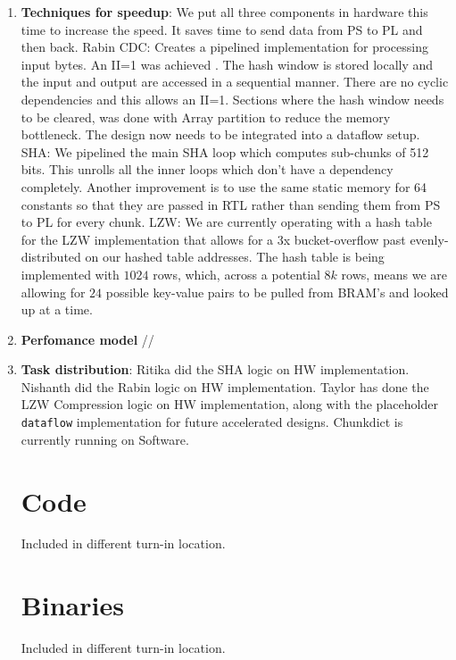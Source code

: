 \documentclass{article}
\begin{document}
\begin{enumerate}
\item%
\textbf{Techniques for speedup}: We put all three components in hardware this time to increase the speed. It saves time to send data from PS to PL and then back.  
Rabin CDC:
Creates a pipelined implementation for processing input bytes. An II=1 was achieved . The hash window is stored locally and the input and output are accessed in a sequential manner. 
There are no cyclic dependencies and this allows an II=1. 
Sections where the hash window needs to be cleared, was done with Array partition to reduce the memory bottleneck. 
The design now needs to be integrated into a dataflow setup. 
SHA:
We pipelined the main SHA loop which computes sub-chunks of 512 bits. This unrolls all the inner loops which don't have a dependency completely. 
 Another improvement is to use the same static memory for 64 constants so that they are passed in RTL rather than sending them from PS to PL for every chunk.
LZW:
We are currently operating with a hash table for the LZW implementation that allows for a 3x bucket-overflow past evenly-distributed on our hashed table addresses. The hash table is being implemented with $1024$ rows, which, across a potential $8k$ rows, means we are allowing for $24$ possible key-value pairs to be pulled from BRAM's and looked up at a time. 
\newline


\item%
\textbf{Perfomance model}
//
\newline


\item%
\textbf{Task distribution}: 
Ritika did the SHA logic on HW implementation. 
Nishanth did the Rabin logic on HW implementation.
Taylor has done the LZW Compression logic on HW implementation, along with the placeholder \texttt{dataflow} implementation for future accelerated designs.
Chunkdict is currently running on Software. 
\newline

\section{Code}

Included in different turn-in location.

\section{Binaries}

Included in different turn-in location.



\end{enumerate}
\end{document}
